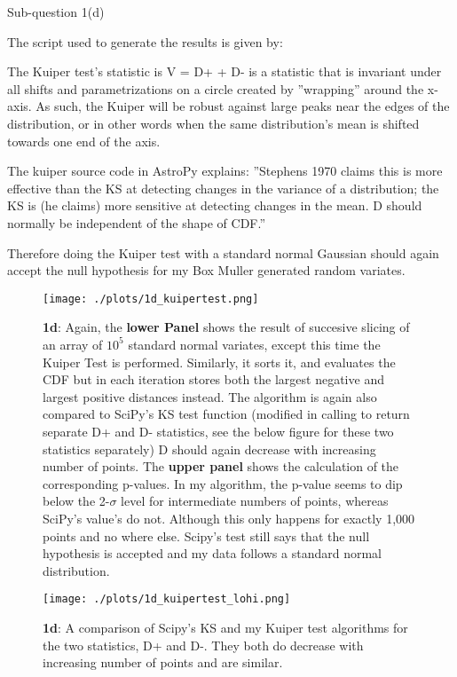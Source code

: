 \begin{subsection}{Sub-question 1(d)}

The script used to generate the results is given by:
  



The Kuiper test's statistic is V = D+ + D- is a statistic that is invariant under all shifts
and parametrizations on a circle created by ''wrapping'' around the x-axis. As such, the Kuiper will be robust against large peaks near the edges of the distribution, or in other words when the same distribution's mean is shifted towards one end of the axis.

The kuiper source code in AstroPy explains: ''Stephens 1970 claims this is more effective than the KS at detecting changes in the variance of a distribution; the KS is (he claims) more sensitive at detecting changes in the mean. D should normally be independent of the shape of CDF.''

Therefore doing the Kuiper test with a standard normal Gaussian should again accept the null hypothesis for my Box Muller generated random variates.


\begin{figure}[h!]
  \centering
  \texttt{[image: ./plots/1d\_kuipertest.png]}
  \caption{\textbf{1d}: Again, the \textbf{lower Panel} shows the result of succesive slicing of an array of $10^5$ standard normal variates, except this time the Kuiper Test is performed. Similarly, it sorts it, and evaluates the CDF but in each iteration stores both the largest negative and largest positive distances instead. The algorithm is again also compared to SciPy's KS test function (modified in calling to return separate D+ and D- statistics, see the below figure for these two statistics separately) D should again decrease with increasing number of points. The \textbf{upper panel} shows the calculation of the corresponding p-values. In my algorithm, the p-value seems to dip below the 2-$\sigma$ level for intermediate numbers of points, whereas SciPy's value's do not. Although this only happens for exactly 1,000 points and no where else. Scipy's test still says that the null hypothesis is accepted and my data follows a standard normal distribution.}
  \label{fig:kuipertest}
\end{figure}



\begin{figure}[h!]
  \centering
  \texttt{[image: ./plots/1d\_kuipertest\_lohi.png]}
  \caption{\textbf{1d}: A comparison of Scipy's KS and my Kuiper test algorithms for the two statistics, D+ and D-. They both do decrease with increasing number of points and are similar.}
  \label{fig:kuipertest2}
\end{figure}


\end{subsection}


